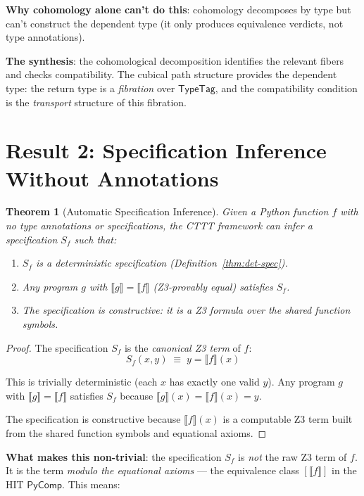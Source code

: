 \documentclass[11pt,a4paper]{report}
\theoremstyle{definition}
\theoremstyle{plain}
\newtheorem{theorem}[definition]{Theorem}
\newcommand{\den}[1]{\llbracket #1 \rrbracket}
\begin{document}
\textbf{Why cohomology alone can't do this}: cohomology decomposes
by type but can't construct the dependent type (it only produces
equivalence verdicts, not type annotations).

\textbf{The synthesis}: the cohomological decomposition identifies the
relevant fibers and checks compatibility.  The cubical path structure
provides the dependent type: the return type is a \emph{fibration}
over $\mathsf{TypeTag}$, and the compatibility condition is the
\emph{transport} structure of this fibration.

\section{Result 2: Specification Inference Without Annotations}

\begin{theorem}[Automatic Specification Inference]
\label{thm:spec-infer}
Given a Python function $f$ with no type annotations or specifications,
the CTTT framework can infer a specification $S_f$ such that:
\begin{enumerate}
  \item $S_f$ is a deterministic specification (Definition~\ref{thm:det-spec}).
  \item Any program $g$ with $\den{g} = \den{f}$ (Z3-provably equal)
    satisfies $S_f$.
  \item The specification is \emph{constructive}: it is a Z3 formula
    over the shared function symbols.
\end{enumerate}
\end{theorem}

\begin{proof}
The specification $S_f$ is the \emph{canonical Z3 term} of $f$:
\[
  S_f(x, y) \;\equiv\; y = \den{f}(x)
\]

This is trivially deterministic (each $x$ has exactly one valid $y$).
Any program $g$ with $\den{g} = \den{f}$ satisfies $S_f$ because
$\den{g}(x) = \den{f}(x) = y$.

The specification is constructive because $\den{f}(x)$ is a computable
Z3 term built from the shared function symbols and equational axioms.
\end{proof}

\textbf{What makes this non-trivial}: the specification $S_f$ is
\emph{not} the raw Z3 term of $f$.  It is the term \emph{modulo the
equational axioms} --- the equivalence class $[\den{f}]$ in the HIT
$\mathsf{PyComp}$.  This means:
\end{document}
